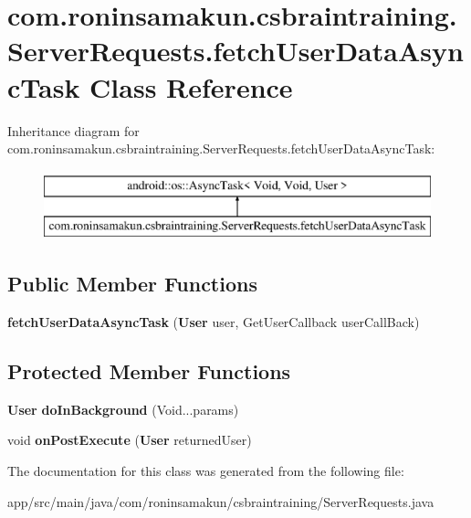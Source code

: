 \section{com.\+roninsamakun.\+csbraintraining.\+Server\+Requests.\+fetch\+User\+Data\+Async\+Task Class Reference}
\label{classcom_1_1roninsamakun_1_1csbraintraining_1_1_server_requests_1_1fetch_user_data_async_task}
Inheritance diagram for com.\+roninsamakun.\+csbraintraining.\+Server\+Requests.\+fetch\+User\+Data\+Async\+Task\+:\begin{figure}[H]
\begin{center}
\leavevmode
\includegraphics[height=2.000000cm]{classcom_1_1roninsamakun_1_1csbraintraining_1_1_server_requests_1_1fetch_user_data_async_task}
\end{center}
\end{figure}
\subsection*{Public Member Functions}
\begin{DoxyCompactItemize}
\item 
{\bfseries fetch\+User\+Data\+Async\+Task} ({\bf User} user, Get\+User\+Callback user\+Call\+Back)\label{classcom_1_1roninsamakun_1_1csbraintraining_1_1_server_requests_1_1fetch_user_data_async_task_a559373101479b002a34bffda3d628c02}

\end{DoxyCompactItemize}
\subsection*{Protected Member Functions}
\begin{DoxyCompactItemize}
\item 
{\bf User} {\bfseries do\+In\+Background} (Void...\+params)\label{classcom_1_1roninsamakun_1_1csbraintraining_1_1_server_requests_1_1fetch_user_data_async_task_ac9838b3eae70674c4b546b978384cc58}

\item 
void {\bfseries on\+Post\+Execute} ({\bf User} returned\+User)\label{classcom_1_1roninsamakun_1_1csbraintraining_1_1_server_requests_1_1fetch_user_data_async_task_a2c12f085f3d6e91bff72b166904bdbe8}

\end{DoxyCompactItemize}


The documentation for this class was generated from the following file\+:\begin{DoxyCompactItemize}
\item 
app/src/main/java/com/roninsamakun/csbraintraining/Server\+Requests.\+java\end{DoxyCompactItemize}
